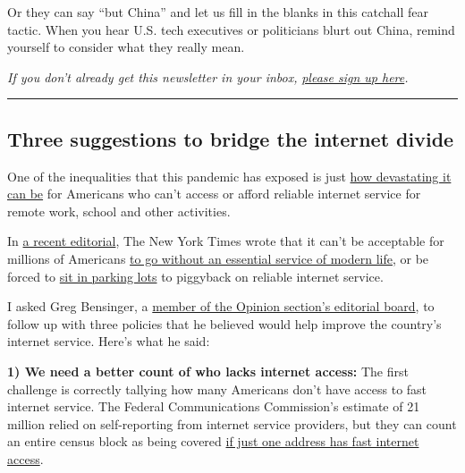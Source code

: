 Or they can say ``but China'' and let us fill in the blanks in this
catchall fear tactic. When you hear U.S. tech executives or politicians
blurt out China, remind yourself to consider what they really mean.

\emph{If you don't already get this newsletter in your inbox,}
\href{https://www.nytimes3xbfgragh.onion/newsletters/signup/OT}{\emph{please
sign up here}}\emph{.}

\begin{center}\rule{0.5\linewidth}{\linethickness}\end{center}

\hypertarget{three-suggestions-to-bridge-the-internet-divide}{%
\subsection{Three suggestions to bridge the internet
divide}\label{three-suggestions-to-bridge-the-internet-divide}}

One of the inequalities that this pandemic has exposed is just
\href{https://www.nytimes3xbfgragh.onion/2020/06/05/us/coronavirus-education-lost-learning.html}{how
devastating it can be} for Americans who can't access or afford reliable
internet service for remote work, school and other activities.

In
\href{https://www.nytimes3xbfgragh.onion/2020/07/18/opinion/sunday/broadband-internet-access-civil-rights.html}{a
recent editorial}, The New York Times wrote that it can't be acceptable
for millions of Americans
\href{https://www.nytimes3xbfgragh.onion/2020/07/18/opinion/sunday/broadband-internet-access-civil-rights.html}{to
go without an essential service of modern life}, or be forced to
\href{https://www.nytimes3xbfgragh.onion/2020/05/05/technology/parking-lots-wifi-coronavirus.html}{sit
in parking lots} to piggyback on reliable internet service.

I asked Greg Bensinger, a
\href{https://www.nytimes3xbfgragh.onion/interactive/2018/opinion/editorialboard.html}{member
of the Opinion section's editorial board}, to follow up with three
policies that he believed would help improve the country's internet
service. Here's what he said:

\textbf{1) We need a better count of who lacks internet access:} The
first challenge is correctly tallying how many Americans don't have
access to fast internet service. The Federal Communications Commission's
estimate of 21 million relied on self-reporting from internet service
providers, but they can count an entire census block as being covered
\href{https://www.nytimes3xbfgragh.onion/2020/05/05/technology/rural-america-digital-divide-coronavirus.html}{if
just one address has fast internet access}.

